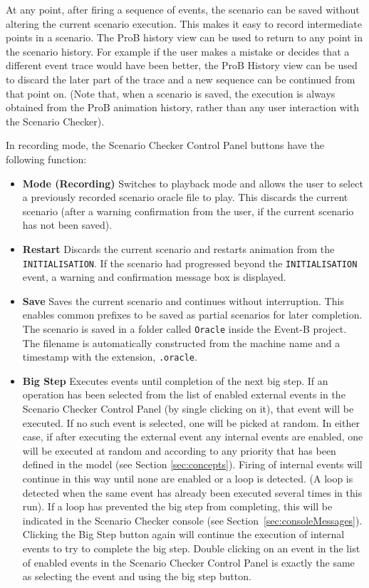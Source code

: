 At any point, after firing a sequence of events, the scenario can be saved without altering the current scenario execution. 
This makes it easy to record intermediate points in a scenario.
The ProB history view can be used to return to any point in the scenario history.
For example if the user makes a mistake or decides that a different event trace would have been better, the ProB History view can be used to discard the later part of the trace and a new sequence can be continued from that point on.
(Note that, when a scenario is saved, the execution is always obtained from the ProB animation history, rather than any user interaction with the Scenario Checker).

In recording mode, the Scenario Checker Control Panel buttons have the following function:
\begin{itemize}
	\item \textbf{Mode (Recording)}  Switches to playback mode and allows the user to select a previously recorded scenario oracle file to play. This discards the current scenario (after a warning confirmation from the user, if the current scenario has not been saved).
	\item \textbf{Restart}  Discards the current scenario and restarts animation from the \texttt{INITIALISATION}. If the scenario had progressed beyond the \texttt{INITIALISATION} event, a warning and confirmation message box is displayed.
	\item \textbf{Save}  Saves the current scenario and continues without interruption. This enables common prefixes to be saved as partial scenarios for later completion. The scenario is saved in a folder called \texttt{Oracle} inside the Event-B project. The filename is automatically constructed from the machine name and a timestamp with the extension, \texttt{.oracle}.
	\item \textbf{Big Step}  Executes events until completion of the next big step. If an operation has been selected from the list of enabled external events in the Scenario Checker Control Panel (by single clicking on it), that event will be executed. If no such event is selected, one will be picked at random. In either case, if after executing the external event any internal events are enabled, one will be executed at random and according to any priority that has been defined in the model (see Section \ref{sec:concepts}). Firing of internal events will continue in this way until none are enabled or a loop is detected. (A loop is detected when the same event has already been executed several times in this run). If a loop has prevented the big step from completing, this will be indicated in the Scenario Checker console (see Section~\ref{sec:consoleMessages}). Clicking the Big Step button again will continue the execution of internal events to try to complete the big step. Double clicking on an event in the list of enabled events in the Scenario Checker Control Panel is exactly the same as selecting the event and using the big step button.

\end{itemize}
